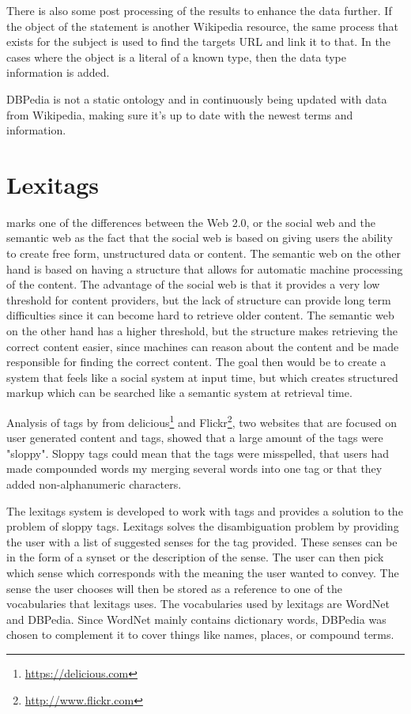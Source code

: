 There is also some post processing of the results to enhance the data further.
If the object of the statement is another Wikipedia resource,
the same process that exists for the subject is used to find the targets URL and link it to that.
In the cases where the object is a literal of a known type, then the data type information is added.

DBPedia is not a static ontology and in continuously being updated with data from Wikipedia,
making sure it's up to date with the newest terms and information.



\section{Lexitags}
\label{Lexitags}
\citet{Veres2011} marks one of the differences between the Web 2.0, or the social web and the semantic web as the
fact that the social web is based on giving users the ability to create free form, unstructured data or content.
The semantic web on the other hand is based on having a structure that allows for automatic machine processing of the content.
The advantage of the social web is that it provides a very low threshold for content providers,
but the lack of structure can provide long term difficulties since it can become hard to retrieve older content.
The semantic web on the other hand has a higher threshold,
but the structure makes retrieving the correct content easier,
since machines can reason about the content and be made responsible for finding the correct content.
The goal then would be to create a system that feels like a social system at input time,
but which creates structured markup which can be searched like a semantic system at retrieval time.

Analysis of tags by \citet{Tonkin2006} from delicious\footnote{\url{https://delicious.com}} and Flickr\footnote{\url{http://www.flickr.com}},
two websites that are focused on user generated content and tags,
showed that a large amount of the tags were "sloppy".
Sloppy tags could mean that the tags were misspelled,
that users had made compounded words my merging several words into one tag
or that they added non-alphanumeric characters.

The lexitags system is developed to work with tags and provides a solution to the problem of sloppy tags.
Lexitags solves the disambiguation problem by providing the user with a list of suggested senses for the tag provided.
These senses can be in the form of a synset or the description of the sense.
The user can then pick which sense which corresponds with the meaning the user wanted to convey\citep{Veres2011}.
The sense the user chooses will then be stored as a reference to one of the vocabularies that lexitags uses.
The vocabularies used by lexitags are WordNet and DBPedia.
Since WordNet mainly contains dictionary words,
DBPedia was chosen to complement it to cover things like names, places, or compound terms.

